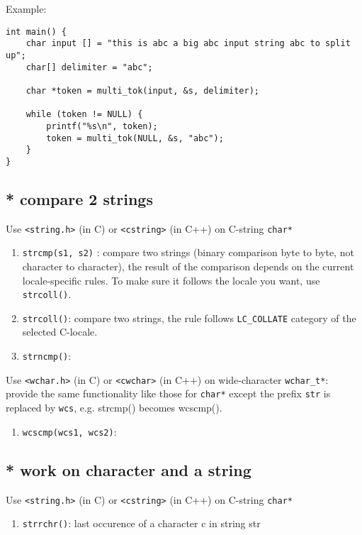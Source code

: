 Example:
\begin{lstlisting}
int main() {
    char input [] = "this is abc a big abc input string abc to split up";
    char[] delimiter = "abc";

    char *token = multi_tok(input, &s, delimiter);

    while (token != NULL) {
        printf("%s\n", token);
        token = multi_tok(NULL, &s, "abc");
    }
}
\end{lstlisting}


\subsection{* compare 2 strings}

Use \verb!<string.h>! (in C) or \verb!<cstring>! (in C++) on  C-string
\verb!char*!
\begin{enumerate}
  \item \verb!strcmp(s1, s2)! : compare two strings (binary comparison byte to
  byte, not character to character), the result of the comparison depends on the
  current locale-specific rules. To make sure it follows the locale you want,
  use \verb!strcoll()!.
  
  \item \verb!strcoll()!: compare two strings, the rule follows
  \verb!LC_COLLATE! category of the selected C-locale.
  
  \item \verb!strncmp()!: 
\end{enumerate}

Use \verb!<wchar.h>! (in C) or \verb!<cwchar>! (in C++) on wide-character
\verb!wchar_t*!: provide the same functionality like those for \verb!char*!  
except the prefix \verb!str! is replaced by \verb!wcs!, e.g. strcmp() becomes
wcscmp().
\begin{enumerate}
  \item \verb!wcscmp(wcs1, wcs2)!: 
\end{enumerate}

\subsection{* work on character and a string}

Use \verb!<string.h>! (in C) or \verb!<cstring>! (in C++) on  C-string
\verb!char*!
\begin{enumerate}
  \item \verb!strrchr()!: last occurence of a character c in string str
\end{enumerate}

